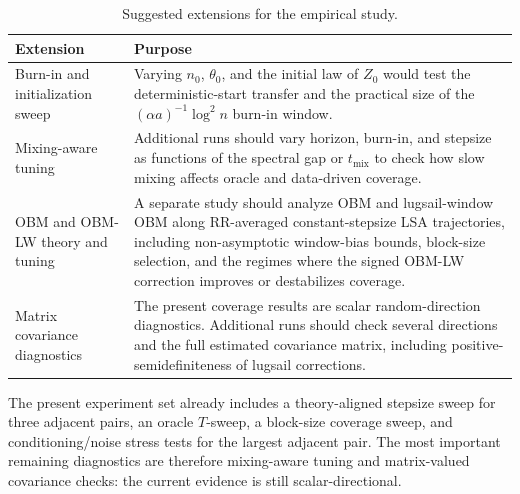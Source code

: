 \begin{table}[htbp]
\caption{Suggested extensions for the empirical study.}
\centering
\small
\begin{tabularx}{\textwidth}{>{\raggedright\arraybackslash}p{}X}
\toprule
\textbf{Extension} & \textbf{Purpose} \\
\midrule
Burn-in and initialization sweep & Varying $n_0$, $\theta_0$, and the initial
law of $Z_0$ would test the deterministic-start transfer and the practical
size of the $(\alpha a)^{-1}\log^2n$ burn-in window. \\
Mixing-aware tuning & Additional runs should vary horizon, burn-in, and
stepsize as functions of the spectral gap or $t_{\mathrm{mix}}$ to check how
slow mixing affects oracle and data-driven coverage. \\
OBM and OBM-LW theory and tuning & A separate study should analyze OBM and
lugsail-window OBM along RR-averaged constant-stepsize LSA trajectories,
including non-asymptotic window-bias bounds, block-size selection, and the
regimes where the signed OBM-LW correction improves or destabilizes coverage. \\
Matrix covariance diagnostics & The present coverage results are scalar
random-direction diagnostics. Additional runs should check several directions
and the full estimated covariance matrix, including positive-semidefiniteness
of lugsail corrections. \\
\bottomrule
\end{tabularx}
\end{table}

The present experiment set already includes a theory-aligned stepsize sweep
for three adjacent pairs, an oracle $T$-sweep, a block-size coverage sweep,
and conditioning/noise stress tests for the largest adjacent pair. The most
important remaining diagnostics are therefore mixing-aware tuning and
matrix-valued covariance checks: the current evidence is still
scalar-directional.
